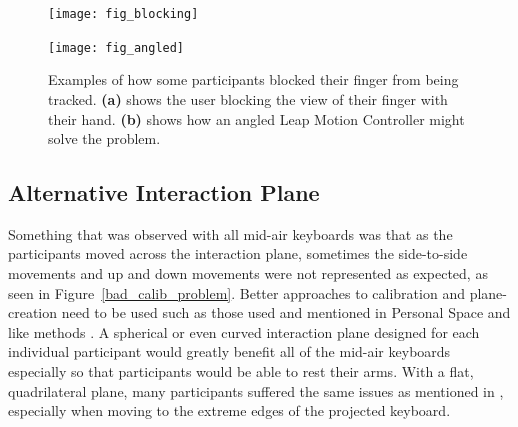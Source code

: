 \begin{figure}[h]
	\centering
	\begin{minipage}[t]{2.5in}
		\texttt{[image: fig\_blocking]}
		\label{finger_blocked}
	\end{minipage}
	\begin{minipage}[t]{2.5in}
		\texttt{[image: fig\_angled]}
		\label{finger_seen}
	\end{minipage}
	\caption[Blocking Problem]{Examples of how some participants blocked their finger from being tracked. \textbf{(a)} shows the user blocking the view of their finger with their hand. \textbf{(b)} shows how an angled Leap Motion Controller might solve the problem.}
	\label{blocking problem}
\end{figure}

\subsection{Alternative Interaction Plane}
Something that was observed with all mid-air keyboards was that as the participants moved across the interaction plane, sometimes the side-to-side movements and up and down movements were not represented as expected, as seen in Figure~\ref{bad_calib_problem}. Better approaches to calibration and plane-creation need to be used such as those used and mentioned in Personal Space and like methods \cite{ref_alvin_thesis,ref_darren_thesis}. A spherical or even curved interaction plane designed for each individual participant would greatly benefit all of the mid-air keyboards especially so that participants would be able to rest their arms. With a flat, quadrilateral plane, many participants suffered the same issues as mentioned in \cite{ref_alvin_thesis}, especially when moving to the extreme edges of the projected keyboard.

